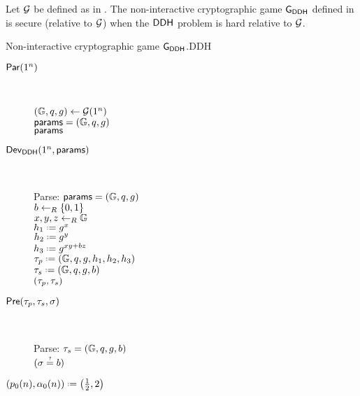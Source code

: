 \begin{thm}
Let $\operatorname{\mathcal{G}}$ be defined as in . The non-interactive cryptographic game $\operatorname{\mathsf{G}}_{\mathsf{DDH}}$ defined in  is secure (relative to $\operatorname{\mathcal{G}}$) when the $\mathsf{DDH}$ problem is hard relative to $\operatorname{\mathcal{G}}$. 
\end{thm}

\begin{boxfigGame}{Non-interactive cryptographic game $\operatorname{\mathsf{G}}_{\mathsf{DDH}}$.}{DDH}
  \begin{description}
  	\item[\underline{$\operatorname{\mathsf{Par}}(1^n)$}] ~ 
  	
		$(\mathbb{G},q,g)\leftarrow\operatorname{\mathcal{G}}(1^n)$\\
		$\mathsf{params} = (\mathbb{G},q,g)$\\
		\Ret $\mathsf{params}$ 	
  	
 	\item[\underline{$\operatorname{\mathsf{Dev}}_{\mathsf{DDH}}(1^n,\mathsf{params})$}] ~
 	
 		Parse: $\mathsf{params}=(\mathbb{G},q,g)$\\
 		$b\leftarrow_R\left\{0,1\right\}$ \\
 		$x,y,z\leftarrow_R\mathbb{G}$ \\
 		$h_1 \defeq g^x$\\
 		$h_2 \defeq g^y$\\
 		$h_3 \defeq g^{xy+bz}$ \\
 		$\ptrans \defeq (\cgroup,\order,\generator,h_1,h_2,h_3)$ \\
 		$\strans \defeq (\cgroup,\order,\generator,b)$\\
 		\Ret $(\tau_p,\tau_s) $

	\item[\underline{$\operatorname{\mathsf{Pre}}(\tau_p,\tau_s,\sigma)$}] ~
	
		Parse: $\tau_s = (\mathbb{G},q,g,b)$\\
		\Ret $\askequal{\sigma}{b}$
		
	\item[\underline{$(\basep(n),\secf(n)) \defeq \left(\frac{1}{2},2\right)$}]
  \end{description}
\end{boxfigGame}

